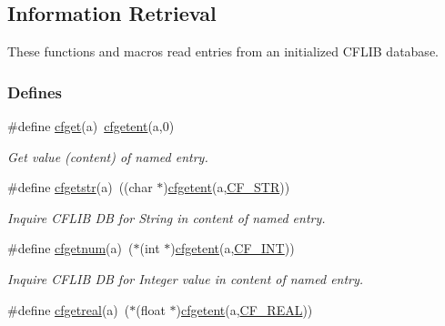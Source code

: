 \hypertarget{group__retrieval}{\subsection{Information Retrieval}
\label{group__retrieval}
}


These functions and macros read entries from an initialized C\-F\-L\-I\-B database.  


\subsubsection*{Defines}
\begin{DoxyCompactItemize}
\item 
\#define \hyperlink{group__retrieval_ga5e2da3f6cf3e36a910362660d167f790}{cfget}(a)~\hyperlink{group__retrieval_gac13ba743ed26e6c05df14817ad9df3da}{cfgetent}(a,0)
\begin{DoxyCompactList}\small\item\em Get value (content) of named entry. \end{DoxyCompactList}\item 
\#define \hyperlink{group__retrieval_ga8cf5f53c5b05ec5ca4f5145010f84eb4}{cfgetstr}(a)~((char $\ast$)\hyperlink{group__retrieval_gac13ba743ed26e6c05df14817ad9df3da}{cfgetent}(a,\hyperlink{group__special__options__mask_ga64c30a2865061d0c1074bc6ec91e3dcf}{C\-F\-\_\-\-S\-T\-R}))
\begin{DoxyCompactList}\small\item\em Inquire C\-F\-L\-I\-B D\-B for String in content of named entry. \end{DoxyCompactList}\item 
\#define \hyperlink{group__retrieval_ga591b741a05205e1ddd599146b996d755}{cfgetnum}(a)~($\ast$(int $\ast$)\hyperlink{group__retrieval_gac13ba743ed26e6c05df14817ad9df3da}{cfgetent}(a,\hyperlink{group__special__options__mask_gab33869d596619ad14675c053925a42e0}{C\-F\-\_\-\-I\-N\-T}))
\begin{DoxyCompactList}\small\item\em Inquire C\-F\-L\-I\-B D\-B for Integer value in content of named entry. \end{DoxyCompactList}\item 
\#define \hyperlink{group__retrieval_ga5f5ec5179e69c2bdfb06ff38a5af16e4}{cfgetreal}(a)~($\ast$(float $\ast$)\hyperlink{group__retrieval_gac13ba743ed26e6c05df14817ad9df3da}{cfgetent}(a,\hyperlink{group__special__options__mask_gaeefdbef320cbd7179f1fb0ebe0fcf5ce}{C\-F\-\_\-\-R\-E\-A\-L}))

\end{DoxyCompactItemize}
